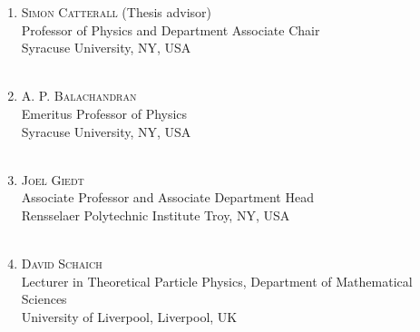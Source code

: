 



\begin{enumerate} 

\item \textsc{Simon Catterall} (Thesis advisor) \\ Professor of Physics and Department Associate Chair \\
Syracuse University, NY, USA \\ 
\\

\item \textsc{A. P. Balachandran} \\ Emeritus Professor of Physics \\
Syracuse University, NY, USA \\ 
\\

\item \textsc{Joel Giedt} \\
Associate Professor and Associate Department Head \\
Rensselaer Polytechnic Institute Troy, NY, USA \\
\\


\item \textsc{David Schaich} \\
Lecturer in  Theoretical Particle Physics, Department of Mathematical Sciences \\
University of Liverpool, Liverpool, UK     \\                      
\\


\end{enumerate}
